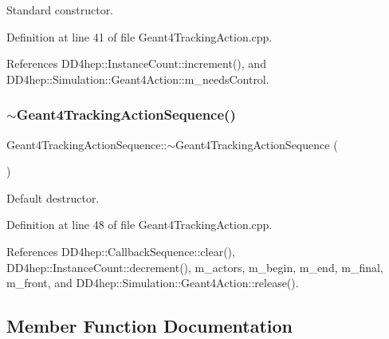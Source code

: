 Standard constructor. 



Definition at line 41 of file Geant4\+Tracking\+Action.\+cpp.



References D\+D4hep\+::\+Instance\+Count\+::increment(), and D\+D4hep\+::\+Simulation\+::\+Geant4\+Action\+::m\+\_\+needs\+Control.

\hypertarget{class_d_d4hep_1_1_simulation_1_1_geant4_tracking_action_sequence_afa29770b5c1d47910c23dc3855244bcf}{}\label{class_d_d4hep_1_1_simulation_1_1_geant4_tracking_action_sequence_afa29770b5c1d47910c23dc3855244bcf} 
\subsubsection{\texorpdfstring{$\sim$\+Geant4\+Tracking\+Action\+Sequence()}{~Geant4TrackingActionSequence()}}
{\footnotesize\ttfamily Geant4\+Tracking\+Action\+Sequence\+::$\sim$\+Geant4\+Tracking\+Action\+Sequence (\begin{DoxyParamCaption}{ }\end{DoxyParamCaption})\hspace{0.3cm}{\ttfamily [virtual]}}



Default destructor. 



Definition at line 48 of file Geant4\+Tracking\+Action.\+cpp.



References D\+D4hep\+::\+Callback\+Sequence\+::clear(), D\+D4hep\+::\+Instance\+Count\+::decrement(), m\+\_\+actors, m\+\_\+begin, m\+\_\+end, m\+\_\+final, m\+\_\+front, and D\+D4hep\+::\+Simulation\+::\+Geant4\+Action\+::release().



\subsection{Member Function Documentation}
\hypertarget{class_d_d4hep_1_1_simulation_1_1_geant4_tracking_action_sequence_a6de81eaad737a180e602a8a826bfa06e}{}\label{class_d_d4hep_1_1_simulation_1_1_geant4_tracking_action_sequence_a6de81eaad737a180e602a8a826bfa06e} 
